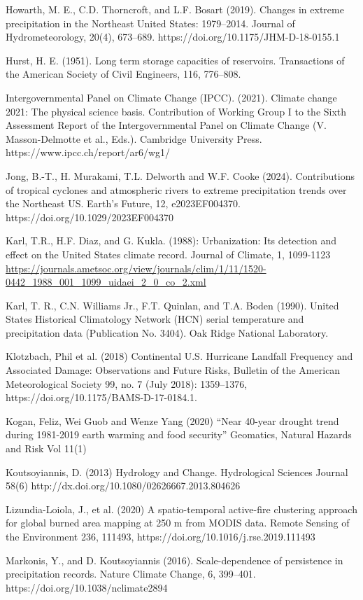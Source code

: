 \documentclass[12pt,paper=a4,DIV=12,parskip=never,chapterprefix=false,headings=standardclasses]{scrreprt}
\begin{document}
Howarth, M. E., C.D. Thorncroft, and L.F. Bosart (2019). Changes in extreme precipitation in the
Northeast United States: 1979–2014. Journal of Hydrometeorology, 20(4), 673–689.
https://doi.org/10.1175/JHM-D-18-0155.1

Hurst, H. E. (1951). Long term storage capacities of reservoirs. Transactions of the American Society of
Civil Engineers, 116, 776–808.

Intergovernmental Panel on Climate Change (IPCC). (2021). Climate change 2021: The physical science
basis. Contribution of Working Group I to the Sixth Assessment Report of the Intergovernmental
Panel on Climate Change (V. Masson-Delmotte et al., Eds.). Cambridge University Press.
https://www.ipcc.ch/report/ar6/wg1/

Jong, B.-T., H. Murakami, T.L. Delworth and W.F. Cooke (2024). Contributions of tropical cyclones and
atmospheric rivers to extreme precipitation trends over the Northeast US. Earth’s Future, 12,
e2023EF004370. https://doi.org/10.1029/2023EF004370

Karl, T.R., H.F. Diaz, and G. Kukla. (1988): Urbanization: Its detection and effect on the United States
climate record. Journal of Climate, 1, 1099-1123
\url{https://journals.ametsoc.org/view/journals/clim/1/11/1520-
0442_1988_001_1099_uidaei_2_0_co_2.xml}

Karl, T. R., C.N. Williams Jr., F.T. Quinlan, and T.A. Boden (1990). United States Historical
Climatology Network (HCN) serial temperature and precipitation data (Publication No. 3404). Oak
Ridge National Laboratory.

Klotzbach, Phil et al. (2018) Continental U.S. Hurricane Landfall Frequency and Associated Damage:
Observations and Future Risks, Bulletin of the American Meteorological Society 99, no. 7 (July
2018): 1359–1376, https://doi.org/10.1175/BAMS-D-17-0184.1.

Kogan, Feliz, Wei Guob and Wenze Yang (2020) “Near 40-year drought trend during 1981-2019 earth
warming and food security” Geomatics, Natural Hazards and Risk Vol 11(1)

Koutsoyiannis, D. (2013) Hydrology and Change. Hydrological Sciences Journal 58(6)
http://dx.doi.org/10.1080/02626667.2013.804626

Lizundia-Loiola, J., et al. (2020) A spatio-temporal active-fire clustering approach for global burned area
mapping at 250 m from MODIS data. Remote Sensing of the Environment 236, 111493,
https://doi.org/10.1016/j.rse.2019.111493

Markonis, Y., and D. Koutsoyiannis (2016). Scale-dependence of persistence in precipitation records.
Nature Climate Change, 6, 399–401. https://doi.org/10.1038/nclimate2894
\end{document}
